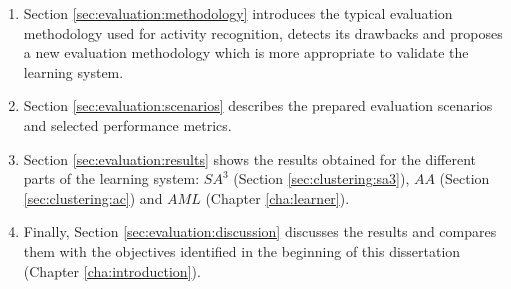 \begin{enumerate}
 \item Section \ref{sec:evaluation:methodology} introduces the typical evaluation methodology used for activity recognition, detects its drawbacks and proposes a new evaluation methodology which is more appropriate to validate the learning system. %
 \item Section \ref{sec:evaluation:scenarios} describes the prepared evaluation scenarios and selected performance metrics. %
 \item Section \ref{sec:evaluation:results} shows the results obtained for the different parts of the learning system: $SA^3$ (Section \ref{sec:clustering:sa3}), $AA$ (Section \ref{sec:clustering:ac}) and $AML$ (Chapter \ref{cha:learner}). %
 \item Finally, Section \ref{sec:evaluation:discussion} discusses the results and compares them with the objectives identified in the beginning of this dissertation (Chapter \ref{cha:introduction}). %
\end{enumerate}
